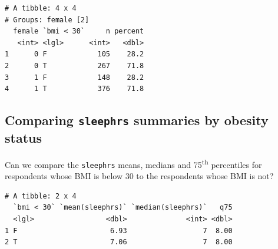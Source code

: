 \documentclass[]{book}
\newenvironment{Shaded}{\begin{snugshade}}{\end{snugshade}}
\newcommand{\KeywordTok}[1]{\textcolor[rgb]{0.13,0.29,0.53}{\textbf{#1}}}
\newcommand{\DataTypeTok}[1]{\textcolor[rgb]{0.13,0.29,0.53}{#1}}
\newcommand{\DecValTok}[1]{\textcolor[rgb]{0.00,0.00,0.81}{#1}}
\newcommand{\FloatTok}[1]{\textcolor[rgb]{0.00,0.00,0.81}{#1}}
\newcommand{\StringTok}[1]{\textcolor[rgb]{0.31,0.60,0.02}{#1}}
\newcommand{\OperatorTok}[1]{\textcolor[rgb]{0.81,0.36,0.00}{\textbf{#1}}}
\newcommand{\NormalTok}[1]{#1}
\theoremstyle{definition}
\theoremstyle{definition}
\theoremstyle{definition}
\theoremstyle{remark}
\begin{document}
\begin{Shaded}
\end{Shaded}

\begin{verbatim}
# A tibble: 4 x 4
# Groups: female [2]
  female `bmi < 30`     n percent
   <int> <lgl>      <int>   <dbl>
1      0 F            105    28.2
2      0 T            267    71.8
3      1 F            148    28.2
4      1 T            376    71.8
\end{verbatim}

\subsection{\texorpdfstring{Comparing \texttt{sleephrs} summaries by
obesity
status}{Comparing sleephrs summaries by obesity status}}\label{comparing-sleephrs-summaries-by-obesity-status}

Can we compare the \texttt{sleephrs} means, medians and
75\textsuperscript{th} percentiles for respondents whose BMI is below 30
to the respondents whose BMI is not?

\begin{Shaded}
\end{Shaded}

\begin{verbatim}
# A tibble: 2 x 4
  `bmi < 30` `mean(sleephrs)` `median(sleephrs)`   q75
  <lgl>                 <dbl>              <int> <dbl>
1 F                      6.93                  7  8.00
2 T                      7.06                  7  8.00
\end{verbatim}
\end{document}
